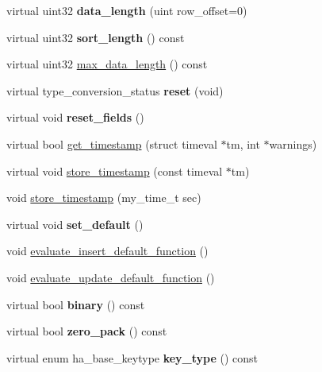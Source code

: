 \begin{DoxyCompactItemize}
virtual uint32 {\bfseries data\+\_\+length} (uint row\+\_\+offset=0)
\item 
\mbox{\label{classField_a868416b6020980007d0056fcd59e2dd2}} 
virtual uint32 {\bfseries sort\+\_\+length} () const
\item 
virtual uint32 \mbox{\hyperlink{classField_ab628f9b9a6253a5b675c97095bf01aac}{max\+\_\+data\+\_\+length}} () const
\item 
\mbox{\label{classField_a61f78c3e3b745d4314b9dc32e7d2d898}} 
virtual type\+\_\+conversion\+\_\+status {\bfseries reset} (void)
\item 
\mbox{\label{classField_ace68c692bb7ef0254ba818c697e2c6d3}} 
virtual void {\bfseries reset\+\_\+fields} ()
\item 
virtual bool \mbox{\hyperlink{classField_ac6b92691afad064d5f80b762a39c0e7f}{get\+\_\+timestamp}} (struct timeval $\ast$tm, int $\ast$warnings)
\item 
virtual void \mbox{\hyperlink{classField_aac6a006a51d128f9cf462b6ce1542def}{store\+\_\+timestamp}} (const timeval $\ast$tm)
\item 
void \mbox{\hyperlink{classField_a34ceda8f27d73b5a547221598ba64db4}{store\+\_\+timestamp}} (my\+\_\+time\+\_\+t sec)
\item 
\mbox{\label{classField_a1372f1bb9a5ff389fd88b50d43a7f4c1}} 
virtual void {\bfseries set\+\_\+default} ()
\item 
void \mbox{\hyperlink{classField_ad48db7aee495c54b9ea9976186bebf07}{evaluate\+\_\+insert\+\_\+default\+\_\+function}} ()
\item 
void \mbox{\hyperlink{classField_a7173d4f8198eab3214a638fd586c1ef8}{evaluate\+\_\+update\+\_\+default\+\_\+function}} ()
\item 
\mbox{\label{classField_a33c634c8d0a722916a6a1e7dae49478f}} 
virtual bool {\bfseries binary} () const
\item 
\mbox{\label{classField_a572ed462f69375c7439237b1f9ba0815}} 
virtual bool {\bfseries zero\+\_\+pack} () const
\item 
\mbox{\label{classField_ae85d62a628dbfcc966c5685657135d07}} 
virtual enum ha\+\_\+base\+\_\+keytype {\bfseries key\+\_\+type} () const

\end{DoxyCompactItemize}

